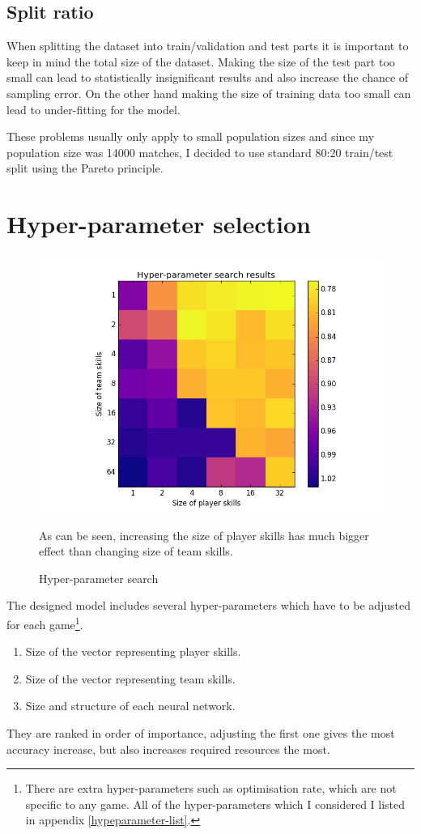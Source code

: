 \documentclass[12pt,a4paper]{book}
\newcommand\note[1]{\vspace*{-0.5\baselineskip}\caption*{#1}}
\begin{document}
\subsection{Split ratio}
When splitting the dataset into train/validation and test parts it is important to keep in mind the total size of the dataset.
Making the size of the test part too small can lead to statistically insignificant results and also increase the chance of sampling error.
On the other hand making the size of training data too small can lead to under-fitting for the model.

These problems usually only apply to small population sizes and since my population size was 14000 matches, I decided to use standard 80:20 train/test split using the Pareto principle.

\section{Hyper-parameter selection}
\begin{figure}[ht]
\centering
\includegraphics[scale=0.5]{hyper-parameter-search}
\caption{Hyper-parameter search}
\note{As can be seen, increasing the size of player skills has much bigger effect than changing size of team skills.}
\label{fig:hyper-parameter-search}
\end{figure}
The designed model includes several hyper-parameters which have to be adjusted for each game\footnote{There are extra hyper-parameters such as optimisation rate, which are not specific to any game. All of the hyper-parameters which I considered I listed in appendix  \ref{hypeparameter-list}.}.
\begin{enumerate}
\item Size of the vector representing player skills.
\item Size of the vector representing team skills.
\item Size and structure of each neural network.
\end{enumerate}
They are ranked in order of importance, adjusting the first one gives the most accuracy increase, but also increases required resources the most.
\end{document}
